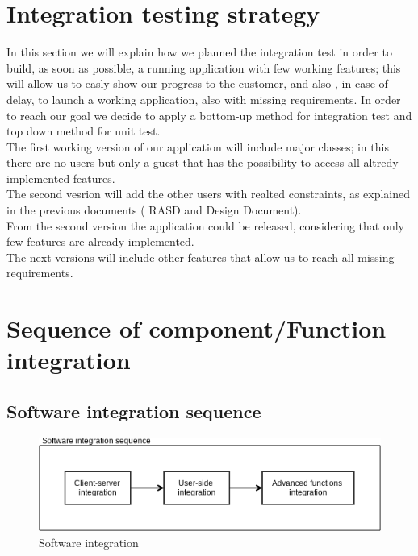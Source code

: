 \section{Integration testing strategy}
In this section we will explain how we planned the integration test
in order to build, as soon as possible, a running application 
with few working features; this will allow us to easly show
our progress to the customer, and also , in case of delay, 
to launch a working application, also with missing requirements.
In order to reach our goal we decide to apply a bottom-up method
for integration test and top down method for unit test.\\
The first working version of our application will include major classes;
in this there are no users but only a guest that has the possibility
to access all altredy implemented features.\\
The second vesrion will add the other users with realted constraints,
as explained in the previous documents ( RASD and Design Document).\\
From the second version the application could be released, considering 
that only few features are already implemented.\\
The next versions will include other features that allow us to reach
all missing requirements.

\section{Sequence of component/Function integration}

\subsection{Software integration sequence}
\begin{figure} [h]
  \centering
  \includegraphics[scale=0.72]{diagrams/software integration.png}
  \caption{\label{fig:soft_int} Software integration}
\end{figure}

